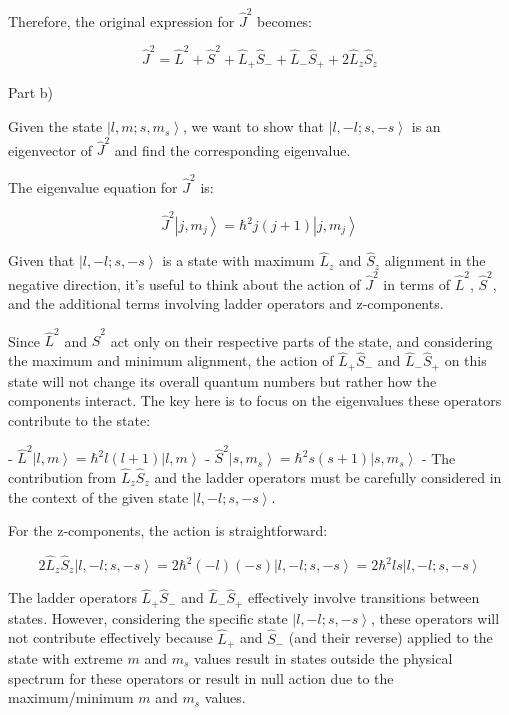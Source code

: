 \documentclass[a4paper,11pt]{article}
\begin{document}
Therefore, the original expression for \( \hat{J}^2 \) becomes:

\[
\hat{J}^2 = \hat{L}^2 + \hat{S}^2 + \hat{L}_{+}\hat{S}_{-} + \hat{L}_{-}\hat{S}_{+} + 2\hat{L}_{z}\hat{S}_{z}
\]

Part b)

Given the state \( \left|l, m; s, m_{s} \right> \), we want to show that \( \left|l, -l; s, -s \right> \) is an eigenvector of \( \hat{J}^2 \) and find the corresponding eigenvalue.

The eigenvalue equation for \( \hat{J}^2 \) is:

\[
\hat{J}^2\left|j, m_j \right> = \hbar^2 j(j+1)\left|j, m_j \right>
\]

Given that \( \left|l, -l; s, -s \right> \) is a state with maximum \( \hat{L}_{z} \) and \( \hat{S}_{z} \) alignment in the negative direction, it's useful to think about the action of \( \hat{J}^2 \) in terms of \( \hat{L}^2 \), \( \hat{S}^2 \), and the additional terms involving ladder operators and z-components.

Since \( \hat{L}^2 \) and \( \hat{S}^2 \) act only on their respective parts of the state, and considering the maximum and minimum alignment, the action of \( \hat{L}_{+}\hat{S}_{-} \) and \( \hat{L}_{-}\hat{S}_{+} \) on this state will not change its overall quantum numbers but rather how the components interact. The key here is to focus on the eigenvalues these operators contribute to the state:

- \( \hat{L}^2 \left|l, m \right> = \hbar^2 l(l+1) \left|l, m \right> \)
- \( \hat{S}^2 \left|s, m_s \right> = \hbar^2 s(s+1) \left|s, m_s \right> \)
- The contribution from \( \hat{L}_{z}\hat{S}_{z} \) and the ladder operators must be carefully considered in the context of the given state \( \left|l, -l; s, -s \right> \).

For the z-components, the action is straightforward:

\[
2\hat{L}_{z}\hat{S}_{z}\left|l, -l; s, -s \right> = 2\hbar^2 (-l)(-s)\left|l, -l; s, -s \right> = 2\hbar^2 ls\left|l, -l; s, -s \right>
\]

The ladder operators \( \hat{L}_{+}\hat{S}_{-} \) and \( \hat{L}_{-}\hat{S}_{+} \) effectively involve transitions between states. However, considering the specific state \( \left|l, -l; s, -s \right> \), these operators will not contribute effectively because \( \hat{L}_{+} \) and \( \hat{S}_{-} \) (and their reverse) applied to the state with extreme \( m \) and \( m_{s} \) values result in states outside the physical spectrum for these operators or result in null action due to the maximum/minimum \( m \) and \( m_{s} \) values.
\end{document}
